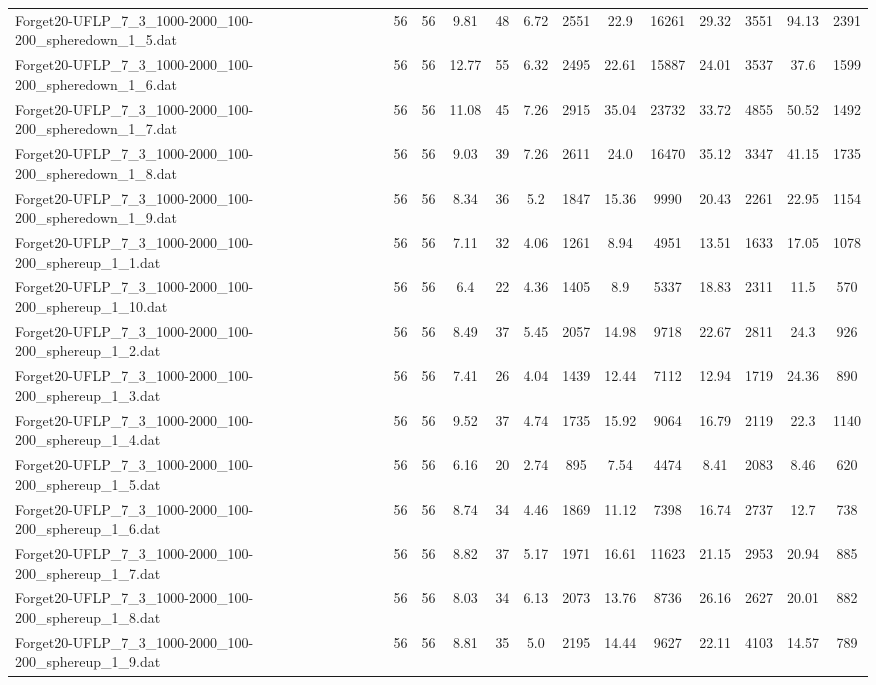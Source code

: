 \begin{table}[!ht]
{\begin{tabular}{lcccccccccccc}
Forget20-UFLP\_7\_3\_1000-2000\_100-200\_spheredown\_1\_5.dat & 56 & 56 & 9.81 & 48 & 6.72 & 2551 & 22.9 & 16261 & 29.32 & 3551 & 94.13 & 2391 \\
Forget20-UFLP\_7\_3\_1000-2000\_100-200\_spheredown\_1\_6.dat & 56 & 56 & 12.77 & 55 & 6.32 & 2495 & 22.61 & 15887 & 24.01 & 3537 & 37.6 & 1599 \\
Forget20-UFLP\_7\_3\_1000-2000\_100-200\_spheredown\_1\_7.dat & 56 & 56 & 11.08 & 45 & 7.26 & 2915 & 35.04 & 23732 & 33.72 & 4855 & 50.52 & 1492 \\
Forget20-UFLP\_7\_3\_1000-2000\_100-200\_spheredown\_1\_8.dat & 56 & 56 & 9.03 & 39 & 7.26 & 2611 & 24.0 & 16470 & 35.12 & 3347 & 41.15 & 1735 \\
Forget20-UFLP\_7\_3\_1000-2000\_100-200\_spheredown\_1\_9.dat & 56 & 56 & 8.34 & 36 & 5.2 & 1847 & 15.36 & 9990 & 20.43 & 2261 & 22.95 & 1154 \\
Forget20-UFLP\_7\_3\_1000-2000\_100-200\_sphereup\_1\_1.dat & 56 & 56 & 7.11 & 32 & 4.06 & 1261 & 8.94 & 4951 & 13.51 & 1633 & 17.05 & 1078 \\
Forget20-UFLP\_7\_3\_1000-2000\_100-200\_sphereup\_1\_10.dat & 56 & 56 & 6.4 & 22 & 4.36 & 1405 & 8.9 & 5337 & 18.83 & 2311 & 11.5 & 570 \\
Forget20-UFLP\_7\_3\_1000-2000\_100-200\_sphereup\_1\_2.dat & 56 & 56 & 8.49 & 37 & 5.45 & 2057 & 14.98 & 9718 & 22.67 & 2811 & 24.3 & 926 \\
Forget20-UFLP\_7\_3\_1000-2000\_100-200\_sphereup\_1\_3.dat & 56 & 56 & 7.41 & 26 & 4.04 & 1439 & 12.44 & 7112 & 12.94 & 1719 & 24.36 & 890 \\
Forget20-UFLP\_7\_3\_1000-2000\_100-200\_sphereup\_1\_4.dat & 56 & 56 & 9.52 & 37 & 4.74 & 1735 & 15.92 & 9064 & 16.79 & 2119 & 22.3 & 1140 \\
Forget20-UFLP\_7\_3\_1000-2000\_100-200\_sphereup\_1\_5.dat & 56 & 56 & 6.16 & 20 & 2.74 & 895 & 7.54 & 4474 & 8.41 & 2083 & 8.46 & 620 \\
Forget20-UFLP\_7\_3\_1000-2000\_100-200\_sphereup\_1\_6.dat & 56 & 56 & 8.74 & 34 & 4.46 & 1869 & 11.12 & 7398 & 16.74 & 2737 & 12.7 & 738 \\
Forget20-UFLP\_7\_3\_1000-2000\_100-200\_sphereup\_1\_7.dat & 56 & 56 & 8.82 & 37 & 5.17 & 1971 & 16.61 & 11623 & 21.15 & 2953 & 20.94 & 885 \\
Forget20-UFLP\_7\_3\_1000-2000\_100-200\_sphereup\_1\_8.dat & 56 & 56 & 8.03 & 34 & 6.13 & 2073 & 13.76 & 8736 & 26.16 & 2627 & 20.01 & 882 \\
Forget20-UFLP\_7\_3\_1000-2000\_100-200\_sphereup\_1\_9.dat & 56 & 56 & 8.81 & 35 & 5.0 & 2195 & 14.44 & 9627 & 22.11 & 4103 & 14.57 & 789 \\

\end{tabular}}
\end{table}
